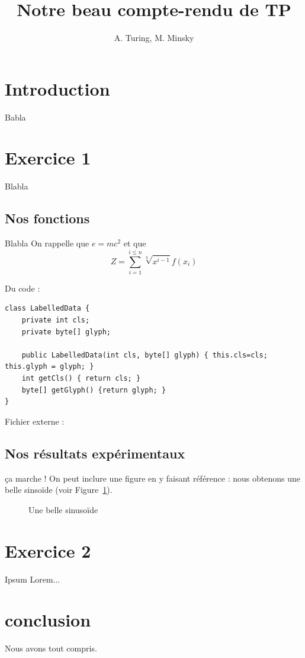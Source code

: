 \documentclass[11pt]{article}
\author{A. Turing, M. Minsky}
\title{Notre beau compte-rendu de TP}
\begin{document}
\maketitle

\section{Introduction}
Babla

\section{Exercice 1}

Blabla

\subsection{Nos fonctions}
%
Blabla On rappelle que $e = mc^2$ %
et que
$$Z=\sum_{i=1}^{i\leq n} \sqrt[3]{x^{i-1}} f(x_i)$$

Du code :
\begin{lstlisting}
class LabelledData {
	private int cls;
	private byte[] glyph;
	
	public LabelledData(int cls, byte[] glyph) { this.cls=cls; this.glyph = glyph; }
	int getCls() { return cls; }
	byte[] getGlyph() {return glyph; }
}
\end{lstlisting}
Fichier externe :


\subsection{Nos résultats expérimentaux}
ça marche !
On peut inclure une figure en y faisant référence : nous obtenons une belle sinsoïde (voir Figure~\ref{sinu}).

\begin{figure}
\caption{Une belle sinusoïde\label{sinu}}	%
\end{figure}

\section{Exercice 2}
Ipsum Lorem...

\section{conclusion}
Nous avons tout compris.
\end{document}
